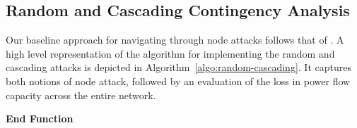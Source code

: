 
\subsection{Random and Cascading Contingency Analysis}

Our baseline approach for navigating through node attacks follows that of \cite{2000Natur.406..378A}. A high level representation of the algorithm for implementing the random and cascading attacks is depicted in Algorithm~\ref{algo:random-cascading}. It captures both notions of node attack, followed by an evaluation of the loss in power flow capacity across the entire network.
%
\begin{algorithm}[ht]
\textbf{End Function}
 \caption{}
 \label{algo:random-cascading}
\end{algorithm}

